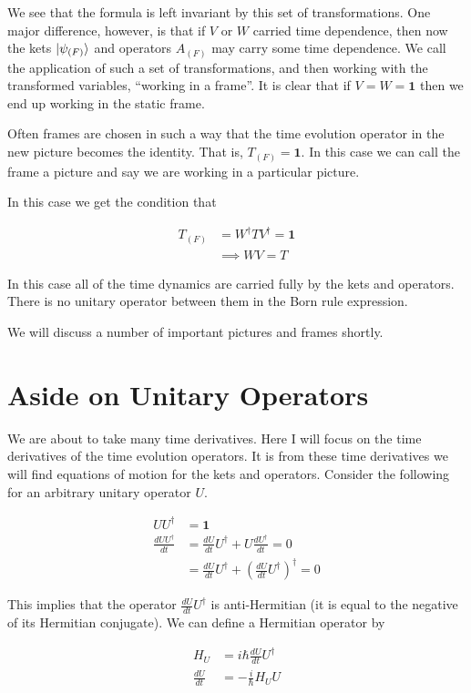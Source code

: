 \documentclass[12pt]{article}
\newcommand{\ddt}[1]{\frac{d #1}{dt}}
\newcommand{\bv}[1]{\boldsymbol{#1}}
\begin{document}
We see that the formula is left invariant by this set of transformations. One major difference, however, is that if $V$ or $W$ carried time dependence, then now the kets $\ket{\psi_{(F)}}$ and operators $A_{(F)}$ may carry some time dependence. We call the application of such a set of transformations, and then working with the transformed variables, ``working in a frame''. It is clear that if $V=W=\bv{1}$ then we end up working in the static frame.

Often frames are chosen in such a way that the time evolution operator in the new picture becomes the identity. That is, $T_{(F)} = \bv{1}$. In this case we can call the frame a picture and say we are working in a particular picture.

In this case we get the condition that

\begin{align}
T_{(F)} &= W^{\dag}TV^{\dag} = \bv{1}\\
&\implies WV = T
\end{align}

In this case all of the time dynamics are carried fully by the kets and operators. There is no unitary operator between them in the Born rule expression.

We will discuss a number of important pictures and frames shortly.

\section{Aside on Unitary Operators}

We are about to take many time derivatives. Here I will focus on the time derivatives of the time evolution operators. It is from these time derivatives we will find equations of motion for the kets and operators. Consider the following for an arbitrary unitary operator $U$.

\begin{align}
U U^{\dag} &= \bv{1}\\
\ddt{UU^{\dag}} &= \ddt{U}U^{\dag} + U \ddt{U^{\dag}} = 0\\
&= \ddt{U} U^{\dag} + \left(\ddt{U} U^{\dag}\right)^{\dag} = 0
\end{align}

This implies that the operator $\ddt{U} U^{\dag}$ is anti-Hermitian (it is equal to the negative of its Hermitian conjugate). We can define a Hermitian operator by

\begin{align}
H_U &= i \hbar \ddt{U}U^{\dag}\\
\ddt{U} &= -\frac{i}{\hbar} H_U U
\end{align}
\end{document}
